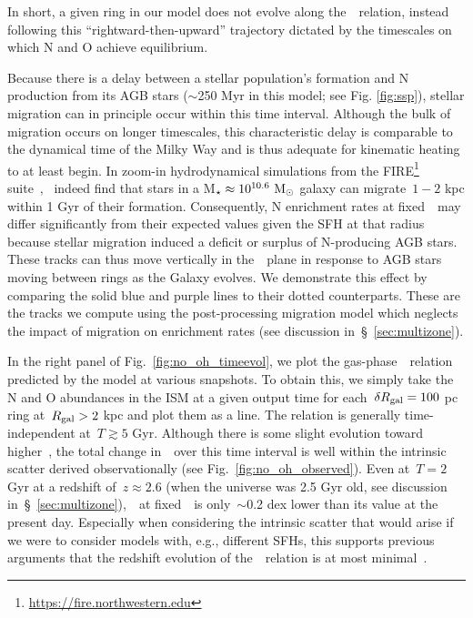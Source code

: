 \documentclass[ms.tex]{subfiles}
\begin{document}
In short, a given ring in our model does not evolve along the~\ohno~relation,
instead following this ``rightward-then-upward'' trajectory dictated by the
timescales on which N and O achieve equilibrium.
\par
Because there is a delay between a stellar population's formation and N
production from its AGB stars ($\sim$250 Myr in this model; see Fig.
\ref{fig:ssp}), stellar migration can in principle occur within this time
interval.
Although the bulk of migration occurs on longer timescales, this characteristic
delay is comparable to the dynamical time of the Milky Way and is thus adequate
for kinematic heating to at least begin.
In zoom-in hydrodynamical simulations from the FIRE\footnote{
	\url{https://fire.northwestern.edu}
} suite~\citep{Hopkins2014},~\citet{El-Badry2016} indeed find that
stars in a M$_\star \approx 10^{10.6}~\text{M}_\odot$ galaxy can migrate~$1 - 2$ kpc
within 1 Gyr of their formation.
Consequently, N enrichment rates at fixed~\rgal~may differ significantly from
their expected values given the SFH at that radius because stellar migration
induced a deficit or surplus of N-producing AGB stars.
These tracks can thus move vertically in the~\ohno~plane in response to AGB
stars moving between rings as the Galaxy evolves.
We demonstrate this effect by comparing the solid blue and purple lines to
their dotted counterparts.
These are the tracks we compute using the post-processing migration model
which neglects the impact of migration on enrichment rates (see discussion
in~\S~\ref{sec:multizone}).
\par
In the right panel of Fig.~\ref{fig:no_oh_timeevol}, we plot the
gas-phase~\ohno~relation predicted by the model at various snapshots.
To obtain this, we simply take the N and O abundances in the ISM at a given
output time for each~$\delta R_\text{gal} = 100$ pc ring at~$R_\text{gal} > 2$ kpc and plot
them as a line.
The relation is generally time-independent at~$T \gtrsim 5$ Gyr.
Although there is some slight evolution toward higher~\no, the total change
in~\no~over this time interval is well within the intrinsic scatter derived
observationally (see Fig.~\ref{fig:no_oh_observed}).
Even at~$T = 2$ Gyr at a redshift of~$z \approx 2.6$ (when the universe was
2.5 Gyr old, see discussion in~\S~\ref{sec:multizone}),~\no~at
fixed~\oh~is only~$\sim$0.2 dex lower than its value at the present day.
Especially when considering the intrinsic scatter that would arise if we were
to consider models with, e.g., different SFHs, this supports previous
arguments that the redshift evolution of the~\ohno~relation is at most
minimal~\citep{Vincenzo2018, HaydenPawson2021}.
\end{document}
